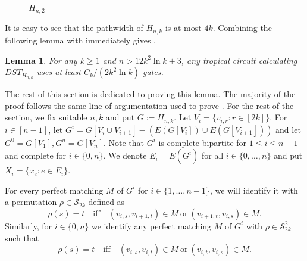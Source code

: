 \documentclass[11pt,a4paper]{article}
\newtheorem{lemma}{Lemma}[section]
\newcommand{\sym}{\mathcal{S}}
\begin{document}
\begin{figure}[h]


    \caption{$H_{n,2}$}
\end{figure}

It is easy to see that the pathwidth of $H_{n, k}$ is at most $4k$. Combining the following lemma with  immediately gives .

\begin{lemma}\label{lem:tc_dst}
    For any $k \geq 1$ and $n > 12k^2 \ln k + 3$, any tropical circuit calculating $DST_{H_{n, k}}$ uses at least
    $C_k / (2k^2 \ln k)$
    gates.
\end{lemma}

The rest of this section is dedicated to proving this lemma. The majority of the proof follows the same line of argumentation used to prove .
For the rest of the section, we fix suitable $n, k$ and put $G := H_{n, k}$. Let $V_i = \{v_{i, r} : r \in [2k]\}$. For $i \in [n - 1]$, let $G^i = G[V_i \cup V_{i + 1}] - (E(G[V_i]) \cup E(G[V_{i+1}]))$ and let $G^0 = G[V_1], G^n = G[V_n]$. Note that $G^i$ is complete bipartite for $1 \leq i \leq n - 1$ and complete for $i \in \{0, n\}$. We denote $E_i = E(G^i)$ for all $i \in \{0, \dots, n\}$ and put $X_i = \{x_e \colon e \in E_i\}$.

For every perfect matching $M$ of $G^i$ for $i \in \{1, \dots, n-1\}$, we will identify it with a permutation $\rho \in \sym_{2k}$ defined as
    $$
        \rho(s) = t \quad \text{iff} \quad (v_{i, s}, v_{i + 1, t}) \in M \ \text{or}\ (v_{i+1, t}, v_{i,s}) \in M.
    $$
    Similarly, for $i \in \{0, n\}$ we identify any perfect matching $M$ of $G^i$ with $\rho \in \sym_{2k}^2$ such that
    $$
        \rho(s) = t \quad \text{iff} \quad (v_{i, s}, v_{i, t}) \in M \ \text{or}\ (v_{i, t}, v_{i, s}) \in M.
    $$
    
\end{document}
